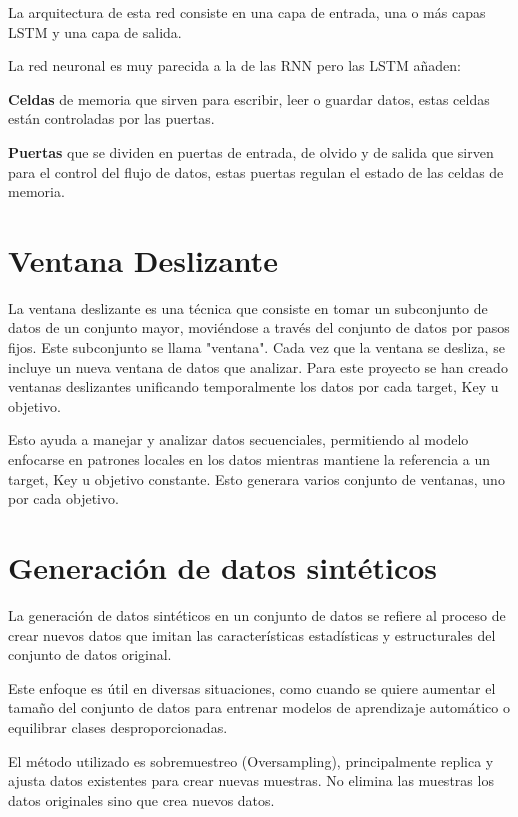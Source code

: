 \begin{itemize}
	La arquitectura de esta red consiste en una capa de entrada, una o más capas LSTM y una capa de salida. 
	
	La red neuronal es muy parecida a la de las RNN pero las LSTM añaden:
	
	\textbf{Celdas} de memoria que sirven para escribir, leer o guardar datos, estas celdas están controladas por las puertas.
	
	\textbf{Puertas} que se dividen en puertas de entrada, de olvido y de salida que sirven para el control del flujo de datos, estas puertas regulan el estado de las celdas de memoria.


\end{itemize}


\section{Ventana Deslizante}

	
La ventana deslizante es una técnica que consiste en tomar un subconjunto de datos de un conjunto mayor, moviéndose a través del conjunto de datos por pasos fijos. Este subconjunto se llama "ventana". Cada vez que la ventana se desliza, se incluye un nueva ventana de datos que analizar. Para este proyecto se han creado ventanas deslizantes unificando temporalmente los datos por cada target, Key u objetivo.

Esto ayuda a manejar y analizar datos secuenciales, permitiendo al modelo enfocarse en patrones locales en los datos mientras mantiene la referencia a un target, Key u objetivo constante. Esto generara varios conjunto de ventanas, uno por cada objetivo.


	
	
\section{Generación de datos sintéticos}

	La generación de datos sintéticos en un conjunto de datos se refiere al proceso de crear nuevos datos que imitan las características estadísticas y estructurales del conjunto de datos original. 
	
	Este enfoque es útil en diversas situaciones, como cuando se quiere aumentar el tamaño del conjunto de datos para entrenar modelos de aprendizaje automático o equilibrar clases desproporcionadas.
	
	El método utilizado es sobremuestreo (Oversampling), principalmente replica y ajusta datos existentes para crear nuevas muestras. No elimina las muestras los datos originales sino que crea nuevos datos.

